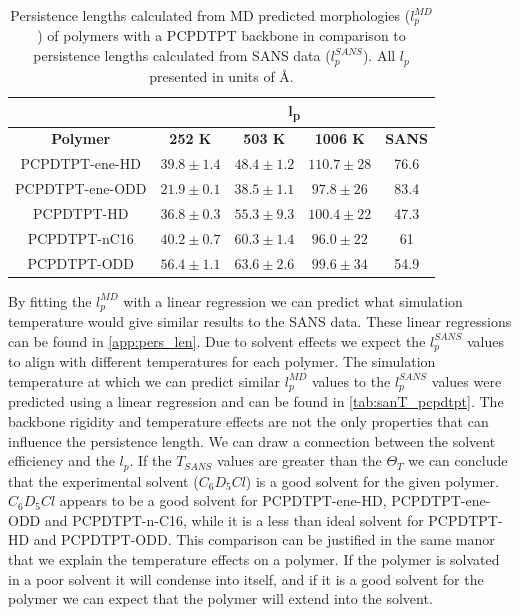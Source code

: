 \begin{table}[ht]
    \centering
    \begin{tabular}{c|c|c|c|c}
                        &  \multicolumn{4}{c}{\textbf{l\textsubscript{p}}}  \\
        \hline
        \textbf{Polymer}  & \textbf{252 K}& \textbf{503 K}& \textbf{1006 K}& \textbf{SANS}\\
        \hline
        PCPDTPT-ene-HD    &   $39.8 \pm 1.4$&	$48.4 \pm 1.2$&   $110.7 \pm 28$&    76.6   \\
        PCPDTPT-ene-ODD   &   $21.9 \pm 0.1$&	$38.5 \pm 1.1$&   $97.8 \pm 26$&    83.4   \\
        PCPDTPT-HD        &   $36.8 \pm 0.3$&	$55.3 \pm 9.3$&   $100.4 \pm 22$&    47.3   \\
        PCPDTPT-nC16      &   $40.2 \pm 0.7$&	$60.3 \pm 1.4$&   $96.0 \pm  22$&    61     \\
        PCPDTPT-ODD       &   $56.4 \pm 1.1$&	$63.6 \pm 2.6$&   $99.6 \pm 34$&    54.9   \\
    \end{tabular}
    \caption{Persistence lengths calculated from MD predicted morphologies ($l_p^{MD}$)  of polymers with a PCPDTPT backbone in comparison to persistence lengths calculated from SANS data ($l_p^{SANS}$). All $l_p$ presented in units of \AA.}
    \label{tab:lp_pcpdtpt}
\end{table}
By fitting the $l_p^{MD}$ with a linear regression we can predict what simulation temperature would give similar results to the SANS data. These linear regressions can be found in \autoref{app:pers_len}. Due to solvent effects we expect the $l_p^{SANS}$ values to align with different temperatures for each polymer. The simulation temperature at which we can predict similar $l_p^{MD}$ values to the $l_p^{SANS}$ values were predicted using a linear regression and can be found in \autoref{tab:sanT_pcpdtpt}. The backbone rigidity and temperature effects are not the only properties that can influence the persistence length. We can draw a connection between the solvent efficiency and the $l_p$. If the $T_{SANS}$ values are greater than the $\Theta_T$ we can conclude that the experimental solvent ($C_{6}D_{5}Cl$) is a good solvent for the given polymer. $C_{6}D_{5}Cl$ appears to be a good solvent for PCPDTPT-ene-HD, PCPDTPT-ene-ODD and PCPDTPT-n-C16, while it is a less than ideal solvent for PCPDTPT-HD and PCPDTPT-ODD. This comparison can be justified in the same manor that we explain the temperature effects on a polymer. If the polymer is solvated in a poor solvent it will condense into itself, and if it is a good solvent for the polymer we can expect that the polymer will extend into the solvent.
